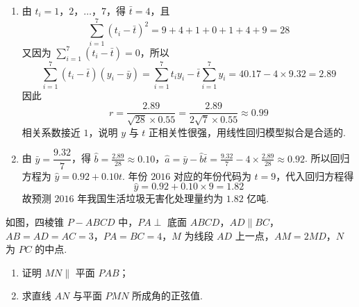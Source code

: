 \begin{solution}
\begin{enumerate}
\item 由 \(t_i=1\)，\(2\)，\(\ldots\)，\(7\)，得 \(\bar t=4\)，且
\[
\sum_{i=1}^{7}(t_i-\bar t)^2=9+4+1+0+1+4+9=28
\]
又因为 \(\sum_{i=1}^{7}(t_i-\bar t)=0\)，所以
\[
\sum_{i=1}^{7}(t_i-\bar t)(y_i-\bar y)=\sum_{i=1}^{7}t_i y_i-\bar t\sum_{i=1}^{7}y_i=40.17-4\times9.32=2.89
\]
因此
\[
r=\frac{2.89}{\sqrt{28}\times0.55}=\frac{2.89}{2\sqrt7\times0.55}\approx0.99
\]
相关系数接近 \(1\)，说明 \(y\) 与 \(t\) 正相关性很强，用线性回归模型拟合是合适的.

\item 由 \(\bar y=\dfrac{9.32}{7}\)，得
\(\hat b=\frac{2.89}{28}\approx0.10\)，\(\hat a=\bar y-\hat b\bar t=\frac{9.32}{7}-4\times\frac{2.89}{28}\approx0.92\).
所以回归方程为 \(\hat y=0.92+0.10t\). 年份 \(2016\) 对应的年份代码为 \(t=9\)，代入回归方程得
\[
\hat y=0.92+0.10\times9=1.82
\]
故预测 \(2016\) 年我国生活垃圾无害化处理量约为 \(1.82\) 亿吨.
\end{enumerate}
\end{solution}

\begin{problem}
如图，四棱锥 \(P-ABCD\) 中，\(PA\perp\) 底面 \(ABCD\)，\(AD\parallel BC\)，\(AB=AD=AC=3\)，\(PA=BC=4\)，\(M\) 为线段 \(AD\) 上一点，\(AM=2MD\)，\(N\) 为 \(PC\) 的中点.

\begin{enumerate}
\item 证明 \(MN\parallel\) 平面 \(PAB\)；
\item 求直线 \(AN\) 与平面 \(PMN\) 所成角的正弦值.
\end{enumerate}

\begingroup
{}
\endgroup
\end{problem}

